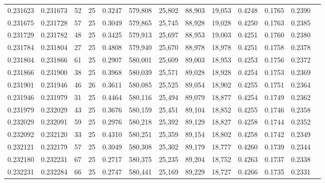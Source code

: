 \begin{tabular}{rrrrrrrrrrrrr}
0.231623 & 0.231673 &    52 &  25 &                                     0.3247 & 579,808 &  25,802 &  88,903 &  19,053 & 0.4248 & 0.1765 & 0.2390 \\
0.231675 & 0.231728 &    57 &  25 &                                     0.3049 & 579,865 &  25,745 &  88,928 &  19,028 & 0.4250 & 0.1763 & 0.2385 \\
0.231729 & 0.231782 &    48 &  25 &                                     0.3425 & 579,913 &  25,697 &  88,953 &  19,003 & 0.4251 & 0.1760 & 0.2380 \\
0.231784 & 0.231804 &    27 &  25 &                                     0.4808 & 579,940 &  25,670 &  88,978 &  18,978 & 0.4251 & 0.1758 & 0.2378 \\
0.231804 & 0.231866 &    61 &  25 &                                     0.2907 & 580,001 &  25,609 &  89,003 &  18,953 & 0.4253 & 0.1756 & 0.2372 \\
0.231866 & 0.231900 &    38 &  25 &                                     0.3968 & 580,039 &  25,571 &  89,028 &  18,928 & 0.4254 & 0.1753 & 0.2369 \\
0.231901 & 0.231946 &    46 &  26 &                                     0.3611 & 580,085 &  25,525 &  89,054 &  18,902 & 0.4255 & 0.1751 & 0.2364 \\
0.231946 & 0.231979 &    31 &  25 &                                     0.4464 & 580,116 &  25,494 &  89,079 &  18,877 & 0.4254 & 0.1749 & 0.2362 \\
0.231979 & 0.232029 &    43 &  25 &                                     0.3676 & 580,159 &  25,451 &  89,104 &  18,852 & 0.4255 & 0.1746 & 0.2358 \\
0.232029 & 0.232091 &    59 &  25 &                                     0.2976 & 580,218 &  25,392 &  89,129 &  18,827 & 0.4258 & 0.1744 & 0.2352 \\
0.232092 & 0.232120 &    33 &  25 &                                     0.4310 & 580,251 &  25,359 &  89,154 &  18,802 & 0.4258 & 0.1742 & 0.2349 \\
0.232121 & 0.232179 &    57 &  25 &                                     0.3049 & 580,308 &  25,302 &  89,179 &  18,777 & 0.4260 & 0.1739 & 0.2344 \\
0.232180 & 0.232231 &    67 &  25 &                                     0.2717 & 580,375 &  25,235 &  89,204 &  18,752 & 0.4263 & 0.1737 & 0.2338 \\
0.232231 & 0.232284 &    66 &  25 &                                     0.2747 & 580,441 &  25,169 &  89,229 &  18,727 & 0.4266 & 0.1735 & 0.2331 \\

\end{tabular}
